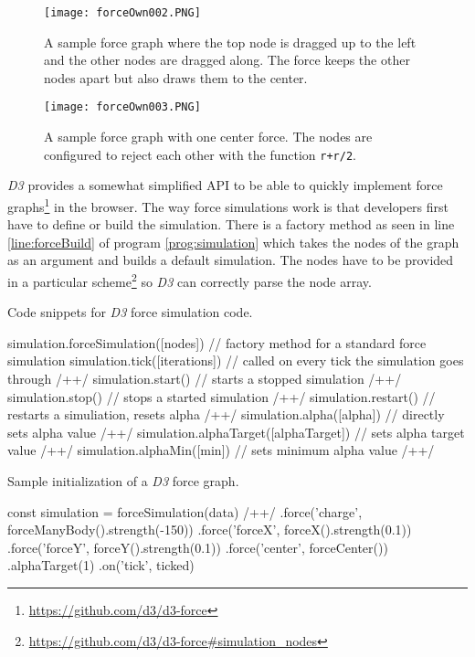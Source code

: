 \begin{figure}
  \centering
  \texttt{[image: forceOwn002.PNG]}
  \caption{A sample force graph where the top node is dragged up to the left and the other nodes are dragged along. The force keeps the other nodes apart but also draws them to the center.}
  \label{fig:force003}
\end{figure}

\begin{figure}
  \centering
  \texttt{[image: forceOwn003.PNG]}
  \caption{A sample force graph with one center force. The nodes are configured to reject each other with the function \texttt{r+r/2}.}
  \label{fig:force004}
\end{figure}

\emph{D3} provides a somewhat simplified API to be able to quickly implement force graphs\footnote{\url{https://github.com/d3/d3-force}} in the browser. The way force simulations work is that developers first have to define or build the simulation. There is a factory method as seen in line \ref{line:forceBuild} of program \ref{prog:simulation} which takes the nodes of the graph as an argument and builds a default simulation. The nodes have to be provided in a particular scheme\footnote{\url{https://github.com/d3/d3-force\#simulation_nodes}} so \emph{D3} can correctly parse the node array. 

\begin{program}
\caption{Code snippets for \emph{D3} force simulation code.}
\label{prog:simulation}
\begin{JsCode}
simulation.forceSimulation([nodes]) // factory method for a standard force simulation
simulation.tick([iterations]) // called on every tick the simulation goes through /+\label{line:manualTick}+/
simulation.start() // starts a stopped simulation /+\label{line:d3ForceStart}+/
simulation.stop() // stops a started simulation /+\label{line:d3ForceStop}+/
simulation.restart() // restarts a simuliation, resets alpha /+\label{line:d3ForceRestart}+/
simulation.alpha([alpha]) // directly sets alpha value /+\label{line:d3ForceAlphaSet}+/
simulation.alphaTarget([alphaTarget]) // sets alpha target value /+\label{line:d3ForceAlphaTarget}+/
simulation.alphaMin([min]) // sets minimum alpha value /+\label{line:d3ForceAlphaMin}+/
\end{JsCode}
\end{program}

\begin{program}
\caption{Sample initialization of a \emph{D3} force graph.}
\label{prog:d3forceinit}
\begin{JsCode}
const simulation = forceSimulation(data) /+\label{line:forceBuild}+/
  .force('charge', forceManyBody().strength(-150))
  .force('forceX', forceX().strength(0.1))
  .force('forceY', forceY().strength(0.1))
  .force('center', forceCenter())
  .alphaTarget(1)
  .on('tick', ticked)
\end{JsCode}
\end{program}

